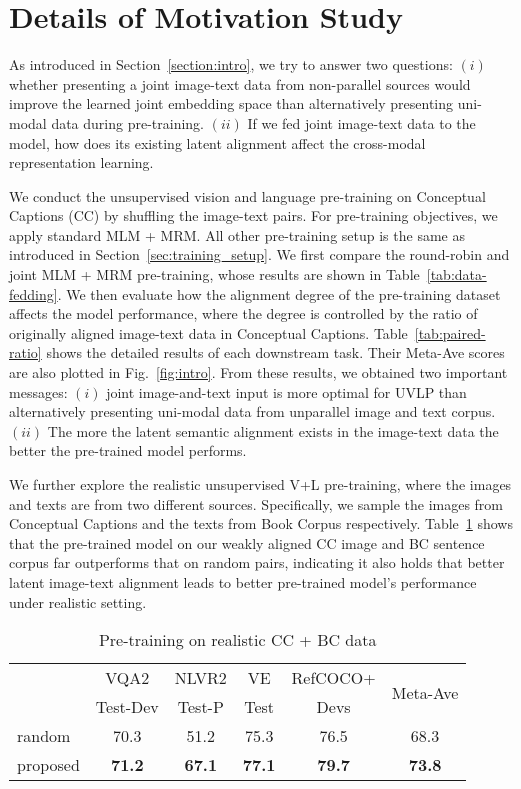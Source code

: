 

\section{Details of Motivation Study}
As introduced in Section~\ref{section:intro}, we try to answer two questions: $(i)$ whether presenting a joint image-text data from non-parallel sources would improve the learned joint embedding space than alternatively presenting uni-modal data during pre-training. $(ii)$ If we fed joint image-text data to the model, how does its existing latent alignment affect the cross-modal representation learning. 

We conduct the unsupervised vision and language pre-training on Conceptual Captions (CC) by shuffling the image-text pairs. 
For pre-training objectives, we apply standard MLM + MRM. 
All other pre-training setup is the same as introduced in Section~\ref{sec:training_setup}. 
We first compare the round-robin and joint MLM + MRM pre-training, whose results are shown in Table~\ref{tab:data-fedding}.
We then evaluate how the alignment degree of the pre-training dataset affects the model performance, where the degree is controlled by the ratio of originally aligned image-text data in Conceptual Captions.
Table~\ref{tab:paired-ratio} shows the detailed results of each downstream task.
Their Meta-Ave scores are also plotted in Fig.~\ref{fig:intro}.
From these results, we obtained two important messages: 
$(i)$ joint image-and-text input is more optimal for UVLP than alternatively presenting uni-modal data from unparallel image and text corpus. 
$(ii)$ The more the latent semantic alignment exists in the image-text data the better the pre-trained model performs. 

We further explore the realistic unsupervised V+L pre-training, where the images and texts are from two different sources.
Specifically, we sample the images from Conceptual Captions and the texts from Book Corpus respectively.
Table~\ref{tab:bc_alignment} shows that the pre-trained model on our weakly aligned CC image and BC sentence corpus far outperforms that on random pairs, indicating it also holds that better latent image-text alignment leads to better pre-trained model's performance under realistic setting.
\begin{table}[!h]
\centering
\small
{}
\begin{tabular}{l|ccccc}\toprule
\multirow{2}{*}{} &VQA2 &NLVR2 &VE & RefCOCO+ & \multirow{2}{*}{ Meta-Ave } \\
&Test-Dev &Test-P &Test &Devs & \\\cmidrule{1-6}
random &70.3 &51.2 &75.3 &76.5 & 68.3 \\
proposed & \bf 71.2 & \bf 67.1 & \bf 77.1 & \bf 79.7 & \bf 73.8 \\
\bottomrule
\end{tabular}
\vspace{-0.3cm}
\caption{Pre-training on realistic CC + BC data}
\label{tab:bc_alignment}
\end{table}

